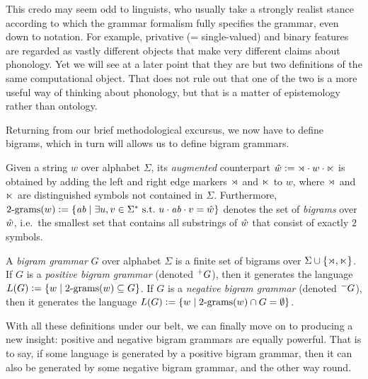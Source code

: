 This credo may seem odd to linguists, who usually take a strongly realist stance according to which the grammar formalism fully specifies the grammar, even down to notation.
For example, privative (= single-valued) and binary features are regarded as vastly different objects that make very different claims about phonology.
Yet we will see at a later point that they are but two definitions of the same computational object.
That does not rule out that one of the two is a more useful way of thinking about phonology, but that is a matter of epistemology rather than ontology.

Returning from our brief methodological excursus, we now have to define bigrams, which in turn will allows us to define bigram grammars.
%
\begin{definition}[Bigrams]
    Given a string $w$ over alphabet $\Sigma$, its \emph{augmented} counterpart $\hat{w} \mathrel{\mathop:}= \rtimes \cdot w \cdot \ltimes$ is obtained by adding the left and right edge markers $\rtimes$ and $\ltimes$ to $w$, where $\rtimes$ and $\ltimes$ are distinguished symbols not contained in $\Sigma$.
    Furthermore, 
    \(
    2\mathrm{\text{-}grams}(w) \mathrel{\mathop:}=
        \left \{ 
            \mathit{ab} \mid \exists u,v \in \Sigma^* \text{ s.t.\ }
                u \cdot \mathit{ab} \cdot v = \hat{w}
         \right \}
    \)
    denotes the set of \emph{bigrams} over $\hat{w}$, i.e.\ the smallest set that contains all substrings of $\hat{w}$ that consist of exactly $2$ symbols.
\end{definition}

\begin{definition}
    A \emph{bigram grammar} $G$ over alphabet $\Sigma$ is a finite set of bigrams over $\Sigma \cup \left \{ \rtimes, \ltimes \right \}$.
    If $G$ is a \emph{positive bigram grammar} (denoted $^+ G$), then it generates the language
    \(
        L(G) \mathrel{\mathop:}= \left \{ 
            w \mid 2\mathrm{\text{-}grams}(w) \subseteq G
         \right \}
    \).
    If $G$ is a \emph{negative bigram grammar} (denoted $^- G$), then it generates the language
    \(
        L(G) \mathrel{\mathop:}= \left \{ 
            w \mid 2\mathrm{\text{-}grams}(w) \cap G = \emptyset
         \right \}
    \).
\end{definition}

With all these definitions under our belt, we can finally move on to producing a new insight: positive and negative bigram grammars are equally powerful.
That is to say, if some language is generated by a positive bigram grammar, then it can also be generated by some negative bigram grammar, and the other way round.

